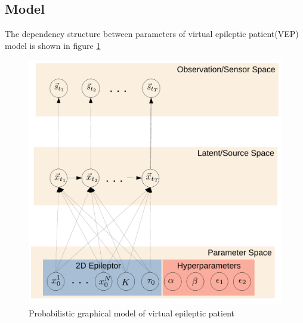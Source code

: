 \documentclass[12pt]{article}
\begin{document}
\subsection*{Model}
The dependency structure between parameters of virtual epileptic patient(VEP) model is shown in figure \ref{fig:vep_model}
\begin{figure}
  \centering
  \includegraphics[width=\textwidth]{figures/vep_model.pdf}
  \caption{Probabilistic graphical model of virtual epileptic patient}
  \label{fig:vep_model}
\end{figure}
\end{document}
